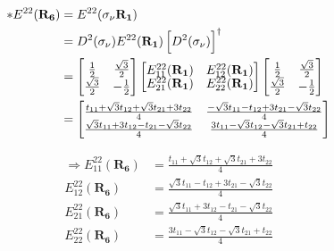 \documentclass{article}
\begin{document}
\begin{align*}
    \ast E^{22}(\mathbf{R_6}) & = E^{22}(\sigma_\nu\mathbf{ R_1})                                                                                               \\
                              & = D^2(\sigma_\nu)  E^{22}(\mathbf{R_1}) \left[ D^2(\sigma_\nu) \right]^\dagger                                                  \\
                              &
    =
    \begin{bmatrix}
        \renewcommand{\arraystretch}{0.72}
        \frac{1}{2}        & \frac{\sqrt{3}}{2} \\
        \frac{\sqrt{3}}{2} & -\frac{1}{2}
    \end{bmatrix}
    \begin{bmatrix}
        E_{11}^{22}(\mathbf{R_1}) & E_{12}^{22}(\mathbf{R_1}) \\
        E_{21}^{22}(\mathbf{R_1}) & E_{22}^{22}(\mathbf{R_1})
    \end{bmatrix}
    \begin{bmatrix}
        \frac{1}{2}        & \frac{\sqrt{3}}{2} \\
        \frac{\sqrt{3}}{2} & -\frac{1}{2}
    \end{bmatrix}                                                                                                     \\
                              & = \begin{bmatrix}
                                      \frac{t_{11} + \sqrt{3}t_{12} + \sqrt{3}t_{21} + 3t_{22}}{4} & \frac{-\sqrt{3}t_{11} - t_{12} + 3 t_{21} - \sqrt{3}t_{22}}{4} \\
                                      \frac{\sqrt{3}t_{11} + 3t_{12} - t_{21} - \sqrt{3}t_{22}}{4} & \frac{3t_{11} - \sqrt{3}t_{12} - \sqrt{3}t_{21} + t_{22}}{4}
                                  \end{bmatrix}
\end{align*}

\begin{align*}
    \Rightarrow E_{11}^{22}(\mathbf{R_6}) & =  \frac{t_{11} + \sqrt{3}t_{12} + \sqrt{3}t_{21} + 3t_{22}}{4} \\
    E_{12}^{22}(\mathbf{R_6})             & = \frac{\sqrt{3}t_{11} - t_{12} + 3 t_{21} - \sqrt{3}t_{22}}{4} \\
    E_{21}^{22}(\mathbf{R_6})             & = \frac{\sqrt{3}t_{11} + 3t_{12} - t_{21} - \sqrt{3}t_{22}}{4}  \\
    E_{22}^{22}(\mathbf{R_6})             & = \frac{3t_{11} - \sqrt{3}t_{12} - \sqrt{3}t_{21} + t_{22}}{4}  \\
\end{align*}
\end{document}
